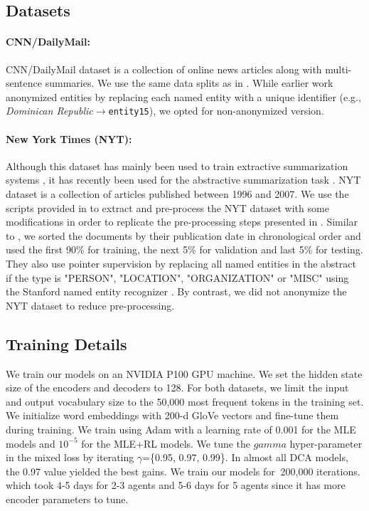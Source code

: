 \documentclass[11pt,a4paper]{article}
\begin{document}
\subsection{Datasets}
\label{app:datasets}
\paragraph{CNN/DailyMail:}
CNN/DailyMail dataset \cite{summs2s,teachingmachines} is a collection of online news articles along with multi-sentence summaries.
We use the same data splits as in \citet{summs2s}. While earlier work anonymized entities by replacing each named entity with a unique identifier (e.g., \textit{Dominican Republic}$\rightarrow$\texttt{entity15}), we opted for non-anonymized version.

\paragraph{New York Times (NYT):}
Although this dataset has mainly been used to train extractive summarization systems \cite{nyt1,nyt2,nyt3,extractivesum}, it has recently been used for the abstractive summarization task \cite{rlsummsocher}. 
NYT dataset \cite{nytdataset} is a collection of articles published between 1996 and 2007. 
We use the scripts provided in \citet{nyt3} to extract and pre-process the NYT dataset with some modifications in order to replicate the pre-processing steps presented in \citet{rlsummsocher}.
Similar to \cite{rlsummsocher}, we sorted the documents by their publication date in chronological order and used the first 90\% for training, the next 5\% for validation and last 5\% for testing. They also use pointer supervision by replacing all named entities in the abstract if the type is "PERSON", "LOCATION", "ORGANIZATION" or "MISC" using the Stanford named entity recognizer \cite{corenlp}. By contrast, 
we did not anonymize the NYT dataset to reduce pre-processing.  

\subsection{Training Details}
\label{app:training}
We train our models on an NVIDIA P100 GPU machine.
We set the hidden state size of the encoders and decoders to 128.
For both datasets, we limit the input and output vocabulary size to the 50,000 most frequent tokens in the training set. 
We initialize word embeddings with 200-d GloVe vectors \cite{pennington2014glove} and fine-tune them during training.
We train using Adam with a learning rate of 0.001 for the MLE models and $10^{-5}$ for the MLE+RL models. We tune the $gamma$ hyper-parameter in the mixed loss by iterating $\gamma$=\{0.95, 0.97, 0.99\}. In almost all DCA models, the 0.97 value yielded the best gains.
We train our models for $~$200,000 iterations. which took 4-5 days for 2-3 agents and 5-6 days for 5 agents since it has more encoder parameters to tune.
\end{document}
